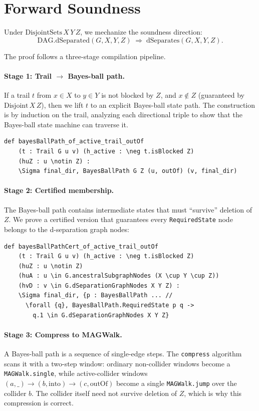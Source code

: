 \documentclass[acmsmall,screen,review,anonymous,nonacm]{acmart}
\newcommand{\lean}[1]{\lstinline!#1!}
\begin{document}
\section{Forward Soundness}\label{sec:forward}

Under $\text{DisjointSets}\,X\,Y\,Z$, we mechanize the soundness direction:
\[
\text{DAG.dSeparated}(G,X,Y,Z) \;\Longrightarrow\; \text{dSeparates}(G,X,Y,Z).
\]

The proof follows a three-stage compilation pipeline.

\paragraph{Stage 1: Trail $\to$ Bayes-ball path.} If a trail $t$ from $x \in X$
to $y \in Y$ is not blocked by $Z$, and $x \notin Z$ (guaranteed by
$\text{Disjoint}\,X\,Z$), then we lift $t$ to an explicit Bayes-ball state path.
The construction is by induction on the trail, analyzing each directional triple
to show that the Bayes-ball state machine can traverse it.

\begin{lstlisting}[caption={Trail to Bayes-ball path}]
def bayesBallPath_of_active_trail_outOf
    (t : Trail G u v) (h_active : \neg t.isBlocked Z)
    (huZ : u \notin Z) :
    \Sigma final_dir, BayesBallPath G Z (u, outOf) (v, final_dir)
\end{lstlisting}

\paragraph{Stage 2: Certified membership.} The Bayes-ball path contains
intermediate states that must ``survive'' deletion of $Z$.  We prove a certified
version that guarantees every \lean{RequiredState} node belongs to the
d-separation graph nodes:

\begin{lstlisting}[caption={Certified Bayes-ball path}]
def bayesBallPathCert_of_active_trail_outOf
    (t : Trail G u v) (h_active : \neg t.isBlocked Z)
    (huZ : u \notin Z)
    (huA : u \in G.ancestralSubgraphNodes (X \cup Y \cup Z))
    (hvD : v \in G.dSeparationGraphNodes X Y Z) :
    \Sigma final_dir, {p : BayesBallPath ... //
      \forall {q}, BayesBallPath.RequiredState p q ->
        q.1 \in G.dSeparationGraphNodes X Y Z}
\end{lstlisting}

\paragraph{Stage 3: Compress to MAGWalk.} A Bayes-ball path is a sequence of
single-edge steps.  The \lean{compress} algorithm scans it with a two-step
window: ordinary non-collider windows become a \lean{MAGWalk.single}, while
active-collider windows $(a,\_) \to (b,\text{into}) \to (c,\text{outOf})$ become
a single \lean{MAGWalk.jump} over the collider $b$.  The collider itself need not
survive deletion of $Z$, which is why this compression is correct.
\end{document}
